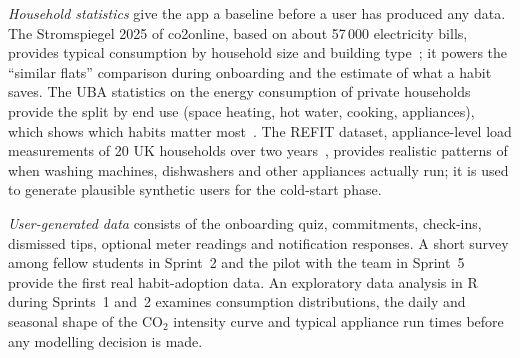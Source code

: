 \documentclass[conference]{IEEEtran}
\newcommand{\COtwo}{CO$_2$}
\begin{document}
\emph{Household statistics} give the app a baseline before a user has produced any data. The Stromspiegel 2025 of co2online, based on about 57\,000 electricity bills, provides typical consumption by household size and building type~\cite{stromspiegel}; it powers the ``similar flats'' comparison during onboarding and the estimate of what a habit saves. The UBA statistics on the energy consumption of private households provide the split by end use (space heating, hot water, cooking, appliances), which shows which habits matter most~\cite{uba-haushalte}. The REFIT dataset, appliance-level load measurements of 20 UK households over two years~\cite{refit}, provides realistic patterns of when washing machines, dishwashers and other appliances actually run; it is used to generate plausible synthetic users for the cold-start phase.

\emph{User-generated data} consists of the onboarding quiz, commitments, check-ins, dismissed tips, optional meter readings and notification responses. A short survey among fellow students in Sprint~2 and the pilot with the team in Sprint~5 provide the first real habit-adoption data. An exploratory data analysis in R during Sprints~1 and~2 examines consumption distributions, the daily and seasonal shape of the \COtwo{} intensity curve and typical appliance run times before any modelling decision is made.
\end{document}
